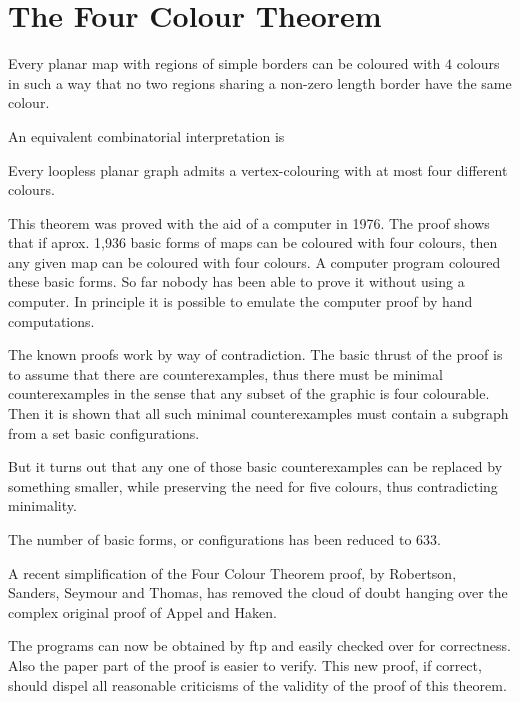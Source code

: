 \section{The Four Colour Theorem}

\bigskip

\begin{teo}
  Every planar map with regions of simple borders can be coloured with
  $4$ colours in such a way that no two regions sharing a non-zero
  length border have the same colour.
\end{teo}

An equivalent combinatorial interpretation is
\begin{teo}
  Every loopless planar graph admits a vertex-colouring with at most
  four different colours.
\end{teo}

This theorem was proved with the aid of a computer in 1976.  The proof
shows that if aprox. 1,936 basic forms of maps can be coloured with four
colours, then any given map can be coloured with four colours. A
computer program coloured these basic forms. So far nobody has been able
to prove it without using a computer. In principle it is possible to
emulate the computer proof by hand computations.

The known proofs work by way of contradiction. The basic thrust of the
proof is to assume that there are counterexamples, thus there must be
minimal counterexamples in the sense that any subset of the graphic is
four colourable. Then it is shown that all such minimal counterexamples
must contain a subgraph from a set basic configurations.

But it turns out that any one of those basic counterexamples can be
replaced by something smaller, while preserving the need for five
colours, thus contradicting minimality.

The number of basic forms, or configurations has been reduced to 633.

A recent simplification of the Four Colour Theorem proof, by Robertson,
Sanders, Seymour and Thomas, has removed the cloud of doubt hanging over
the complex original proof of Appel and Haken.

The programs can now be obtained by ftp and easily checked over for
correctness. Also the paper part of the proof is easier to verify. This
new proof, if correct, should dispel all reasonable criticisms of the
validity of the proof of this theorem.

